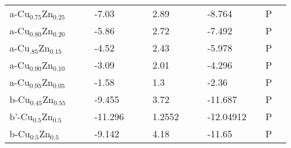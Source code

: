 \documentclass{article}
\begin{document}
\begin{center}
\begin{longtable}{|l|p{2.5cm}|l|p{2.5cm}|l|l|p{2.5cm}|l|l|p{2.5cm}|l|l|l|}
a-Cu$_{0.75}$Zn$_{0.25}$     &                            &                   & -7.03               &     & \citep{KubaschewskiCatterallJohnAshley.1956} & 2.89               &     & \citep{KubaschewskiCatterallJohnAshley.1956} & -8.764                              &     & P                 \\
a-Cu$_{0.80}$Zn$_{0.20}$     &                            &                   & -5.86               &     & \citep{KubaschewskiCatterallJohnAshley.1956} & 2.72               &     & \citep{KubaschewskiCatterallJohnAshley.1956} & -7.492                              &     & P                 \\
a-Cu$_{.85}$Zn$_{0.15 }$    &                            &                   & -4.52               &     & \citep{KubaschewskiCatterallJohnAshley.1956} & 2.43               &     & \citep{KubaschewskiCatterallJohnAshley.1956} & -5.978                              &     & P                 \\
a-Cu$_{0.90}$Zn$_{0.10 }$    &                            &                   & -3.09               &     & \citep{KubaschewskiCatterallJohnAshley.1956} & 2.01               &     & \citep{KubaschewskiCatterallJohnAshley.1956} & -4.296                              &     & P                 \\
a-Cu$_{0.95}$Zn$_{0.05 }$    &                            &                   & -1.58               &     & \citep{KubaschewskiCatterallJohnAshley.1956} & 1.3                &     & \citep{KubaschewskiCatterallJohnAshley.1956} & -2.36                               &     & P                 \\
b-Cu$_{0.45}$Zn$_{0.55 }$    &                            &                   & -9.455              &     & \citep{KubaschewskiCatterallJohnAshley.1956} & 3.72               &     & \citep{KubaschewskiCatterallJohnAshley.1956} & -11.687                             &     & P                 \\
b'-Cu$_{0.5}$Zn$_{0.5 }$     &                            &                   & -11.296             &     & \citep{KubaschewskiCatterallJohnAshley.1956} & 1.2552             &     & \citep{KubaschewskiCatterallJohnAshley.1956} & -12.04912                           &     & P                 \\
b-Cu$_{0.5}$Zn$_{0.5 }$      &                            &                   & -9.142              &     & \citep{KubaschewskiCatterallJohnAshley.1956} & 4.18               &     & \citep{KubaschewskiCatterallJohnAshley.1956} & -11.65                              &     & P                 \\

\end{longtable}
\end{center}
\end{document}
